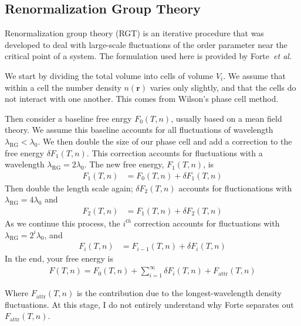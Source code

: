 \documentclass[letterpaper,twocolumn,amsmath,amssymb,prb]{revtex4-1}
\newcommand{\rr}{\ensuremath{\mathbf{r}}}
\newcommand{\Fattr}{\ensuremath{F_\text{attr}(T,n)}}
\newcommand{\lambdaRG}{\ensuremath{\lambda_\text{RG}}}
\newcommand{\1}{\ensuremath{\textbf{r}_1}}
\newcommand{\2}{\ensuremath{\textbf{r}_2}}
\newcommand{\3}{\ensuremath{\textbf{r}_3}}
\newcommand{\4}{\ensuremath{\textbf{r}_4}}
\begin{document}
\subsection{Renormalization Group Theory}\label{subsec:RGT}
Renormalization group theory (RGT) is an iterative procedure that was
developed to deal with large-scale fluctuations of the order parameter
near the critical point of a system. The formulation used here is
provided by Forte~\textit{et al}.\cite{Forte11}

We start by dividing the total volume into cells of volume $V_i$. We
assume that within a cell the number density $n(\rr)$ varies only slightly, and that the
cells do not interact with one another. This comes from Wilson's
phase cell method.\cite{Ramana12}

Then consider a baseline free enrgy $F_0(T,n)$, usually based on a
mean field theory. We assume this baseline accounts for all
fluctuations of wavelength $\lambdaRG < \lambda_0$. We then
double the size of our phase cell and add a correction to the free
energy $\delta F_1(T,n)$. This correction accounts for fluctuations
with a wavelength $\lambdaRG = 2\lambda_0$. The new free
energy, $F_1(T,n)$, is
\begin{align}
  F_1(T,n) &= F_0(T,n) + \delta F_1(T,n)
\end{align}
Then double the length scale again; $\delta F_2(T,n)$ accounts for
fluctionations with $\lambdaRG = 4\lambda_0$ and
\begin{align}
  F_2(T,n) &= F_1(T,n) + \delta F_2(T,n)
\end{align}
As we continue this process, the $i^{th}$ correction accounts for
fluctuations with $\lambdaRG = 2^i\lambda_0$, and
\begin{align}
  F_i(T,n) &= F_{i-1}(T,n) + \delta F_i(T,n)
\end{align}
In the end, your free energy is
\begin{align}
  F(T,n) = F_0(T,n) + \sum_{i=1}^\infty\delta F_i(T,n) + \Fattr
\end{align}

Where $\Fattr$ is the contribution due to the longest-wavelength
density fluctuations. At this stage, I do not entirely understand why
Forte separates out $\Fattr$.
\end{document}
